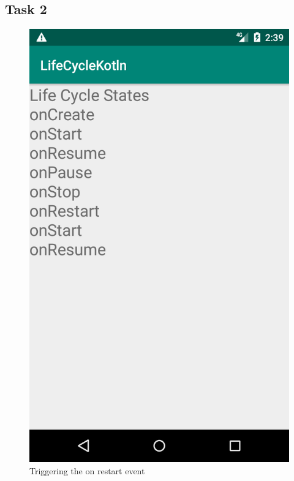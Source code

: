 \documentclass{scrartcl}
\begin{document}
\pagebreak

\subsection*{Task 2}

\begin{figure}[h]
    \centering
    \includegraphics[scale=0.2]{images/onrestart.png}
    \caption{Triggering the on restart event}
\end{figure}
\end{document}
